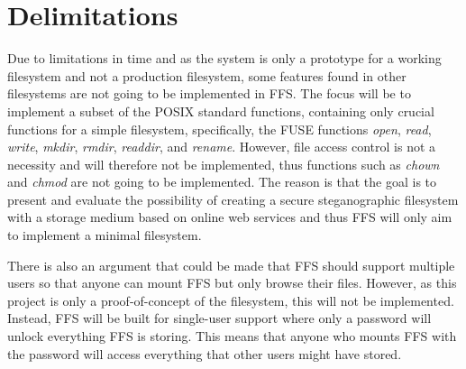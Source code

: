 \section{Delimitations} %

Due to limitations in time and as the system is only a prototype for a working filesystem and not a production filesystem, some features found in other filesystems are not going to be implemented in FFS. The focus will be to implement a subset of the POSIX standard functions, containing only crucial functions for a simple filesystem, specifically, the FUSE functions \textit{open}, \textit{read}, \textit{write}, \textit{mkdir}, \textit{rmdir}, \textit{readdir}, and \textit{rename}. However, file access control is not a necessity and will therefore not be implemented, thus functions such as \textit{chown} and \textit{chmod} are not going to be implemented. The reason is that the goal is to present and evaluate the possibility of creating a secure steganographic filesystem with a storage medium based on online web services and thus FFS will only aim to implement a minimal filesystem. 

There is also an argument that could be made that FFS should support multiple users so that anyone can mount FFS but only browse their files. However, as this project is only a proof-of-concept of the filesystem, this will not be implemented. Instead, FFS will be built for single-user support where only a password will unlock everything FFS is storing. This means that anyone who mounts FFS with the password will access everything that other users might have stored.

